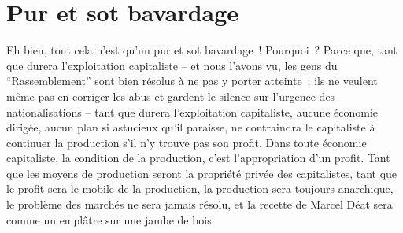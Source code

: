 \documentclass[french,twoside]{book} %
\begin{document}
\section[Pur et sot bavardage]{Pur et sot bavardage}
\noindent Eh bien, tout cela n’est qu’un pur et sot bavardage ! Pourquoi ? Parce que, tant que durera l’exploitation capitaliste – et nous l’avons vu, les gens du “Rassemblement” sont bien résolus à ne pas y porter atteinte ; ils ne veulent même pas en corriger les abus et gardent le silence sur l’urgence des nationalisations – tant que durera l’exploitation capitaliste, aucune économie dirigée, aucun plan si astucieux qu’il paraisse, ne contraindra le capitaliste à continuer la production s’il n’y trouve pas son profit. Dans toute économie capitaliste, la condition de la production, c’est l’appropriation d’un profit. Tant que les moyens de production seront la propriété privée des capitalistes, tant que le profit sera le mobile de la production, la production sera toujours anarchique, le problème des marchés ne sera jamais résolu, et la recette de Marcel Déat sera comme un emplâtre sur une jambe de bois.
\end{document}
